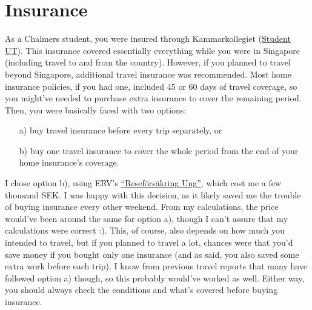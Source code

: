 \section*{Insurance}
{}
As a Chalmers student, you were insured through Kammarkollegiet (\href{https://www.kammarkollegiet.se/vara-tjanster/forsakring-och-riskhantering/forsakringar-for-studier-och-utlandska-besokare/utresande-utbytesstudenter-student-ut}{Student UT}). This insurance covered essentially everything while you were in Singapore (including travel to and from the country). However, if you planned to travel beyond Singapore, additional travel insurance was recommended. Most home insurance policies, if you had one, included 45 or 60 days of travel coverage, so you might've needed to purchase extra insurance to cover the remaining period. Then, you were basically faced with two options:
\begin{itemize}
    \item[a)] buy travel insurance before every trip separately, or
    \item[b)] buy one travel insurance to cover the whole period from the end of your home insurance's coverage. 
\end{itemize}
I chose option b), using ERV's \href{https://www.erv.se/privat/vara-reseforsakringar/reseforsakring-ung/}{``Reseförsäkring Ung''}, which cost me a few thousand SEK. I was happy with this decision, as it likely saved me the trouble of buying insurance every other weekend. From my calculations, the price would've been around the same for option a), though I can't assure that my calculations were correct :). This, of course, also depends on how much you intended to travel, but if you planned to travel a lot, chances were that you'd save money if you bought only one insurance (and as said, you also saved some extra work before each trip). I know from previous travel reports that many have followed option a) though, so this probably would've worked as well. Either way, you should always check the conditions and what's covered before buying insurance.
